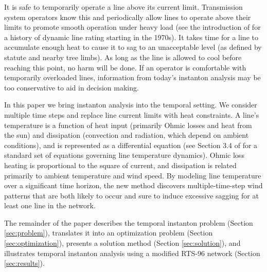 \documentclass[conference]{IEEEtran}
\begin{document}
It is safe to temporarily operate a line above its current limit. Transmission system operators know this and periodically allow lines to operate above their limits to promote smooth operation under heavy load (see the introduction of \cite{banakar2005} for a history of dynamic line rating starting in the 1970s). It takes time for a line to accumulate enough heat to cause it to sag to an unacceptable level (as defined by statute and nearby tree limbs). As long as the line is allowed to cool before reaching this point, no harm will be done. If an operator is comfortable with temporarily overloaded lines, information from today's instanton analysis may be too conservative to aid in decision making.

In this paper we bring instanton analysis into the temporal setting. We consider multiple time steps and replace line current limits with heat constraints. A line's temperature is a function of heat input (primarily Ohmic losses and heat from the sun) and dissipation (convection and radiation, which depend on ambient conditions), and is represented as a differential equation (see Section 3.4 of \cite{ieee2007} for a standard set of equations governing line temperature dynamics). Ohmic loss heating is proportional to the square of current, and dissipation is related primarily to ambient temperature and wind speed. By modeling line temperature over a significant time horizon, the new method discovers multiple-time-step wind patterns that are both likely to occur and sure to induce excessive sagging for at least one line in the network.

The remainder of the paper describes the temporal instanton problem (Section \ref{sec:problem}), translates it into an optimization problem (Section \ref{sec:optimization}), presents a solution method (Section \ref{sec:solution}), and illustrates temporal instanton analysis using a modified RTS-96 network (Section \ref{sec:results}).
\end{document}
